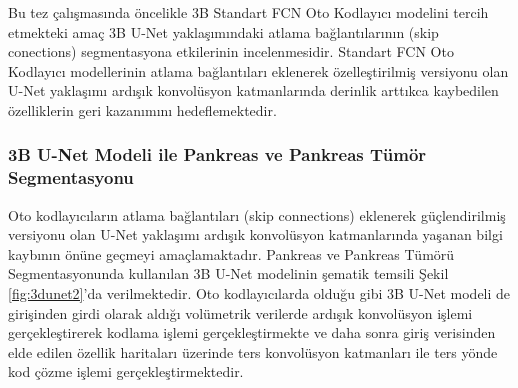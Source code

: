 Bu tez çalışmasında öncelikle 3B Standart FCN Oto Kodlayıcı modelini tercih etmekteki amaç 3B U-Net yaklaşımındaki atlama bağlantılarının (skip conections) segmentasyona etkilerinin incelenmesidir. Standart FCN Oto Kodlayıcı modellerinin atlama bağlantıları eklenerek özelleştirilmiş versiyonu olan U-Net yaklaşımı ardışık konvolüsyon katmanlarında derinlik arttıkca kaybedilen özelliklerin geri kazanımını hedeflemektedir.

\subsubsection{3B U-Net Modeli ile Pankreas ve Pankreas Tümör Segmentasyonu}
Oto kodlayıcıların atlama bağlantıları (skip connections) eklenerek güçlendirilmiş versiyonu olan U-Net yaklaşımı ardışık konvolüsyon katmanlarında yaşanan bilgi kaybının önüne geçmeyi amaçlamaktadır. Pankreas ve Pankreas Tümörü Segmentasyonunda kullanılan 3B U-Net modelinin şematik temsili Şekil \ref{fig:3dunet2}'da verilmektedir. Oto kodlayıcılarda olduğu gibi 3B U-Net modeli de girişinden girdi olarak aldığı volümetrik verilerde ardışık konvolüsyon işlemi gerçekleştirerek kodlama işlemi gerçekleştirmekte ve daha sonra giriş verisinden elde edilen özellik haritaları üzerinde ters konvolüsyon katmanları ile ters yönde kod çözme işlemi gerçekleştirmektedir.

